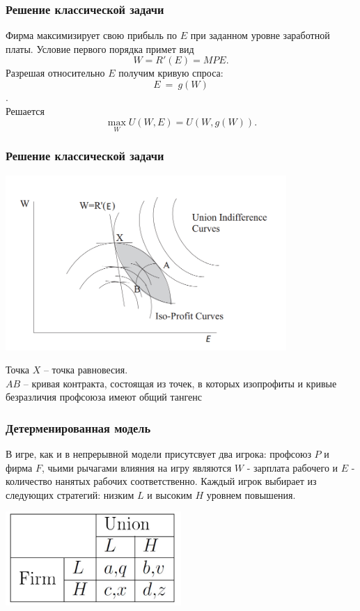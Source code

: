 \documentclass {beamer}
\begin{document}
\begin{frame}
	\frametitle{Решение классической задачи}
	
	Фирма максимизирует свою прибыль по $E$ при заданном уровне заработной платы. Условие первого порядка примет вид
	$$ W = R'(E) = MPE. $$
	Разрешая относительно $E$ получим кривую спроса: $$E~=~g(W)$$.\\
	Решается
	$$ \max_W U(W,E) = U(W,g(W)). $$
\end{frame}


\begin{frame}
	\frametitle{Решение классической задачи}

 \begin{center}
 	\includegraphics[width=0.8\textwidth]{monopoly_union}
 \end{center}
 Точка $X$ -- точка равновесия.\\
 $AB$ -- кривая контракта, состоящая из точек, в которых изопрофиты и кривые безразличия профсоюза имеют общий тангенс
\end{frame}

\begin{frame}
	
	\frametitle{Детерменированная модель}
	
	В игре, как и в непрерывной модели присутсвует два игрока: профсоюз $P$ и фирма $F$, чьими рычагами влияния на игру являются $W$ - зарплата рабочего и $E$ - количество нанятых рабочих соответственно.
	Каждый игрок выбирает из следующих стратегий: низким $L$ и высоким $H$ уровнем повышения.
	\begin{center}
		\includegraphics[width=0.5\textwidth]{sixth}
	\end{center}
\end{frame}
\end{document}
